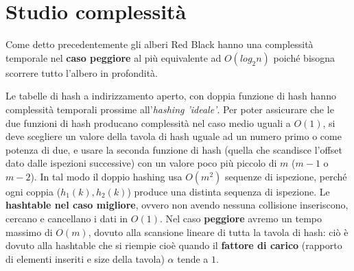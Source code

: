 \def\baselinestretch{1}
\section{Studio complessit\`a}
\def\baselinestretch{1.66}
\thispagestyle{headings}
\indent Come detto precedentemente gli alberi Red Black hanno una complessit\`a temporale
nel \textbf{caso peggiore} al pi\`u equivalente ad $O(log_2 n)$ poich\'e bisogna scorrere tutto
l'albero in profondit\`a.\newline

\indent Le tabelle di hash a indirizzamento aperto, con doppia funzione di hash hanno complessit\`a temporali
prossime all'\textit{hashing 'ideale'}. Per poter assicurare che le due funzioni di hash producano
complessit\`a nel caso medio uguali a $O(1)$, si deve scegliere un valore della tavola di hash uguale ad
un numero primo o come potenza di due, e usare la seconda funzione di hash (quella che scandisce l'offset
dato dalle ispezioni successive) con un valore poco pi\`u piccolo di $m$ ($m-1$ o $m-2$).
In tal modo il doppio hashing usa $O(m^2)$ sequenze di ispezione,
perch\'e ogni coppia ($h_1(k), h_2(k)$) produce una distinta sequenza di ispezione.
Le \textbf{hashtable nel caso migliore}, ovvero non avendo nessuna collisione inseriscono,
cercano e cancellano i dati in $O(1)$.
Nel caso \textbf{peggiore} avremo un tempo massimo di $O(m)$,
dovuto alla scansione lineare di tutta la tavola di hash: ci\`o \`e  dovuto alla hashtable che si riempie
cio\`e quando il \textbf{ fattore di carico} (rapporto di elementi
inseriti e size della tavola) $\alpha$ tende a $1$.\newline

